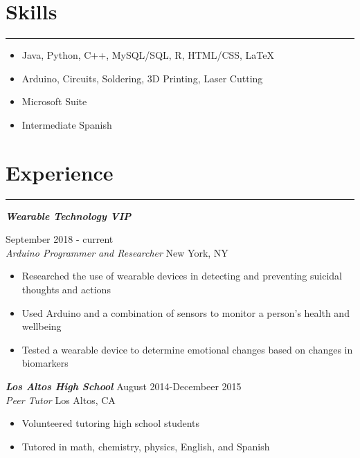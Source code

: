 \documentclass[line, margin]{res}
\begin{document}
\begin{resume}
\section{Skills}
\vspace{.3em}
\hspace{-9.8em}
\rule{6.5in}{0.5pt}
\begin{itemize}[noitemsep,nolistsep]
\item Java, Python, C++, MySQL/SQL, R, HTML/CSS, LaTeX
\item Arduino, Circuits, Soldering, 3D Printing, Laser Cutting
\item Microsoft Suite
\item Intermediate Spanish
\end{itemize}

\section{Experience}
\vspace{.3em}
\hspace{-9.8em}
\rule{6.5in}{0.5pt}
\textit{\upshape \textbf{Wearable Technology VIP}} \hfill \raggedright September 2018 - current\\
\textit{Arduino Programmer and Researcher} \hfill New York, NY
\begin{itemize}[noitemsep,nolistsep]
\item Researched the use of wearable devices in detecting and preventing suicidal thoughts and actions
\item Used Arduino and a combination of sensors to monitor a person’s health and wellbeing
\item Tested a wearable device to determine emotional changes based on changes in biomarkers
\end{itemize}
\textit{\upshape \textbf{Los Altos High School}} \hfill August 2014-Decembeer 2015\\ \textit{Peer Tutor} \hfill Los Altos, CA
\begin{itemize}[noitemsep,nolistsep]
\item Volunteered tutoring high school students 
\item Tutored in math, chemistry, physics, English, and Spanish
\end{itemize}


\end{resume}
\end{document}
